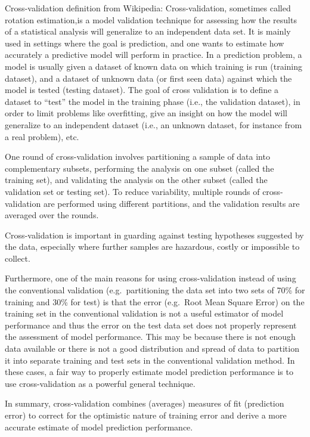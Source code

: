 \documentclass{article}
\begin{document}
Cross-validation definition from Wikipedia: Cross-validation, sometimes
called rotation estimation,is a model validation technique for assessing
how the results of a statistical analysis will generalize to an
independent data set. It is mainly used in settings where the goal is
prediction, and one wants to estimate how accurately a predictive model
will perform in practice. In a prediction problem, a model is usually
given a dataset of known data on which training is run (training
dataset), and a dataset of unknown data (or first seen data) against
which the model is tested (testing dataset). The goal of cross
validation is to define a dataset to ``test'' the model in the training
phase (i.e., the validation dataset), in order to limit problems like
overfitting, give an insight on how the model will generalize to an
independent dataset (i.e., an unknown dataset, for instance from a real
problem), etc.

One round of cross-validation involves partitioning a sample of data
into complementary subsets, performing the analysis on one subset
(called the training set), and validating the analysis on the other
subset (called the validation set or testing set). To reduce
variability, multiple rounds of cross-validation are performed using
different partitions, and the validation results are averaged over the
rounds.

Cross-validation is important in guarding against testing hypotheses
suggested by the data, especially where further samples are hazardous,
costly or impossible to collect.

Furthermore, one of the main reasons for using cross-validation instead
of using the conventional validation (e.g.~partitioning the data set
into two sets of 70\% for training and 30\% for test) is that the error
(e.g.~Root Mean Square Error) on the training set in the conventional
validation is not a useful estimator of model performance and thus the
error on the test data set does not properly represent the assessment of
model performance. This may be because there is not enough data
available or there is not a good distribution and spread of data to
partition it into separate training and test sets in the conventional
validation method. In these cases, a fair way to properly estimate model
prediction performance is to use cross-validation as a powerful general
technique.

In summary, cross-validation combines (averages) measures of fit
(prediction error) to correct for the optimistic nature of training
error and derive a more accurate estimate of model prediction
performance.
\end{document}
